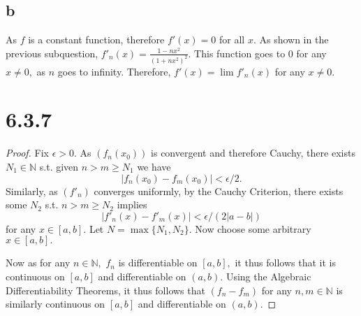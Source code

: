 \documentclass[10pt]{article}
\begin{document}
\subsection*{b}

As $f$ is a constant function, therefore $f'(x)=0$ for all $x$. As shown in the previous subquestion, $f'_n(x)=\frac{1-nx^2}{(1+nx^2)^2}.$
This function goes to $0$ for any $x\neq 0,$ as $n$ goes to infinity. Therefore, $f'(x)=\lim f'_n(x)$ for any $x\neq 0.$

\section*{6.3.7}

\begin{proof}
    Fix $\epsilon>0.$
    As $(f_n(x_0))$ is convergent and therefore Cauchy, there exists $N_1\in\mathbb{N}$ s.t. given $n>m\ge N_1$ we have
    \begin{equation} \label{eq:c2}
        |f_n(x_0)-f_m(x_0)|<\epsilon/2.
    \end{equation}
    Similarly, as $(f'_n)$ converges uniformly, by the Cauchy Criterion, there exists some $N_2$ s.t. $n>m\ge N_2$ implies 
    \begin{equation} \label{eq:c1}
        |f'_n(x)-f'_m(x)|<\epsilon/(2|a-b|)
    \end{equation}
    for any $x\in[a,b].$
    Let $N=\max\{N_1,N_2\}.$ Now choose some arbitrary $x\in[a,b].$

    Now as for any $n\in\mathbb{N},$ $f_n$ is differentiable on $[a,b],$  it thus follows that it is continuous on $[a,b]$ and differentiable on $(a,b).$ Using the Algebraic Differentiability Theorems, it thus follows that $(f_n-f_m)$ for any $n,m\in\mathbb{N}$ is similarly continuous on $[a,b]$ and differentiable on $(a,b).$
    

\end{proof}
\end{document}
